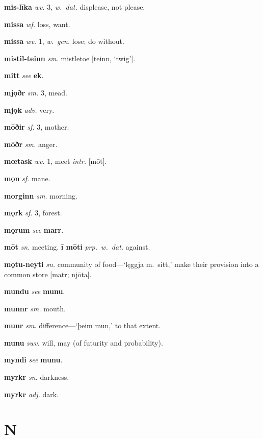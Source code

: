 \documentclass[12pt,letterpaper]{book}
\newcommand\emptypage{\clearpage{\pagestyle{empty}\cleardoublepage}}
\begin{document}
\noindent
\textbf{mis-līka} \textit{wv.} 3, \textit{w.\ dat.} displease, not please.

\noindent
\textbf{missa} \textit{wf.} loss, want.

\noindent
\textbf{missa} \textit{wv.} 1, \textit{w.\ gen.} lose; do without.

\noindent
\textbf{mistil-teinn} \textit{sm.} mistletoe [teinn, `twig'].

\noindent
\textbf{mitt} \textit{} \textit{see} \textbf{ek}.

\noindent
\textbf{mjǫðr} \textit{sm.} 3, mead.

\noindent
\textbf{mjǫk} \textit{adv.} very.

\noindent
\textbf{mōðir} \textit{sf.} 3, mother.

\noindent
\textbf{mōðr} \textit{sm.} anger.

\noindent
\textbf{mœtask} \textit{wv.} 1, meet \textit{intr.} [mōt].

\noindent
\textbf{mǫn} \textit{sf.} mane.

\noindent
\textbf{morginn} \textit{sm.} morning.

\noindent
\textbf{mǫrk} \textit{sf.} 3, forest.

\noindent
\textbf{mǫrum} \textit{} \textit{see} \textbf{marr}.

\noindent
\textbf{mōt} \textit{sn.} meeting.  \textbf{ī mōti} \textit{prp.\ w.\ dat.}
	against.

\noindent
\textbf{mǫtu-neyti} \textit{sn.} community of food---`lęggja m.\ sitt,'
	make their provision into a common store [matr; njōta].

\noindent
\textbf{mundu} \textit{} \textit{see} \textbf{munu}.

\noindent
\textbf{munnr} \textit{sm.} mouth.

\noindent
\textbf{munr} \textit{sm.} difference---`þeim mun,' to that extent.

\noindent
\textbf{munu} \textit{swv.} will, may (of futurity and probability).

\noindent
\textbf{myndi} \textit{} \textit{see} \textbf{munu}.

\noindent
\textbf{myrkr} \textit{sn.} darkness.

\noindent
\textbf{myrkr} \textit{adj.} dark.

\emptypage

\chapter*{N}
\end{document}

